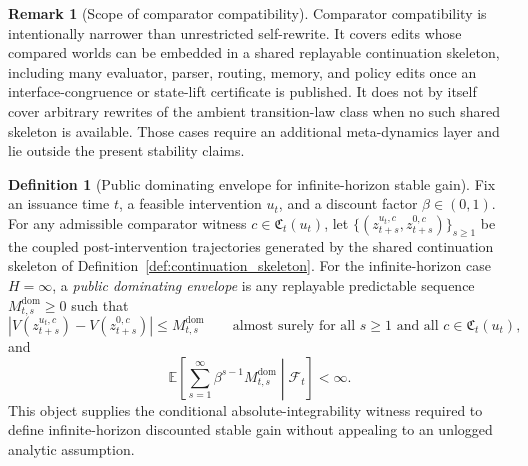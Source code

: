\documentclass[11pt]{article}
\theoremstyle{definition}
\newtheorem{definition}[theorem]{Definition}
\newtheorem{remark}[theorem]{Remark}
\newcommand{\E}{\mathbb{E}}
\newcommand{\1}{\mathbf{1}}
\newcommand{\abs}[1]{\left\lvert #1 \right\rvert}
\begin{document}
\begin{remark}[Scope of comparator compatibility]\label{rem:comp_scope}
Comparator compatibility is intentionally narrower than unrestricted self-rewrite. It covers edits whose compared worlds can be embedded in a shared replayable continuation skeleton, including many evaluator, parser, routing, memory, and policy edits once an interface-congruence or state-lift certificate is published. It does not by itself cover arbitrary rewrites of the ambient transition-law class when no such shared skeleton is available. Those cases require an additional meta-dynamics layer and lie outside the present stability claims.
\end{remark}

\begin{definition}[Public dominating envelope for infinite-horizon stable gain]\label{def:dominating_envelope}
Fix an issuance time $t$, a feasible intervention $u_t$, and a discount factor $\beta\in(0,1)$. For any admissible comparator witness $c\in\mathfrak C_t(u_t)$, let $\{(z_{t+s}^{u_t,c},z_{t+s}^{0,c})\}_{s\ge1}$ be the coupled post-intervention trajectories generated by the shared continuation skeleton of Definition~\ref{def:continuation_skeleton}. For the infinite-horizon case $H=\infty$, a \emph{public dominating envelope} is any replayable predictable sequence $M_{t,s}^{\mathrm{dom}}\ge 0$ such that
\[
\abs{V(z_{t+s}^{u_t,c})-V(z_{t+s}^{0,c})}\le M_{t,s}^{\mathrm{dom}}
\qquad\text{almost surely for all }s\ge 1\text{ and all }c\in\mathfrak C_t(u_t),
\]
and
\[
\E\!\left[\sum_{s=1}^{\infty}\beta^{s-1}M_{t,s}^{\mathrm{dom}}\middle|\mathcal F_t\right]<\infty.
\]
This object supplies the conditional absolute-integrability witness required to define infinite-horizon discounted stable gain without appealing to an unlogged analytic assumption.
\end{definition}
\end{document}
